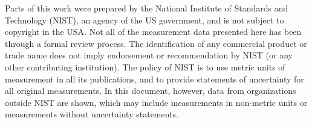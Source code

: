 \documentclass{book}
\begin{document}
Parts of this work were prepared by the National Institute of Standards and Technology (NIST), an agency of the US government, and is not subject to copyright in the USA. Not all of the measurement data presented here has been through a formal review process. The identification of any commercial product or trade name does not imply endorsement or recommendation by NIST (or any other contributing institution). The policy of NIST is to use metric units of measurement in all its publications, and to provide statements of uncertainty for all original measurements. In this document, however, data from organizations outside NIST are shown, which may include measurements in non-metric units or measurements without uncertainty statements.



\newpage
\thispagestyle{fancy}
\tableofcontents

\mainmatter
\pagestyle{fancy}
\end{document}
